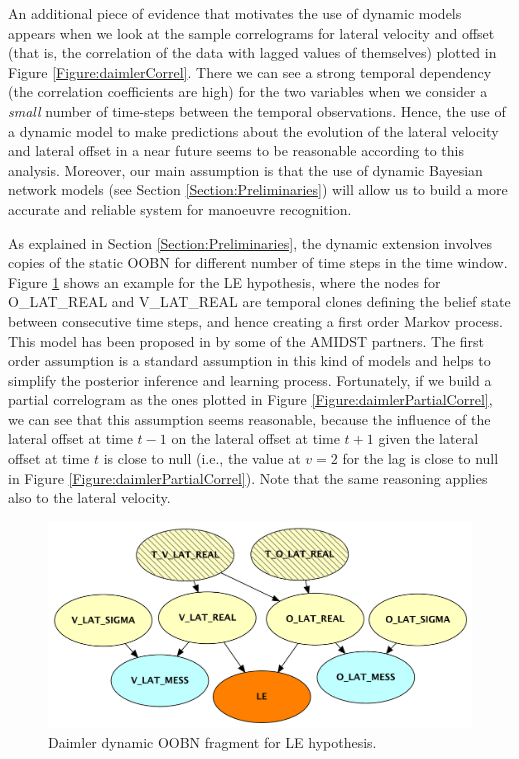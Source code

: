 An additional piece of evidence that motivates the use of dynamic models appears when we look at the sample correlograms for lateral velocity and offset (that is, the correlation of the data with lagged values of themselves) plotted in Figure \ref{Figure:daimlerCorrel}. There we can see a strong temporal dependency (the correlation coefficients are high) for the two variables when we consider a \textit{small} number of time-steps between the temporal observations. Hence, the use of a dynamic model to make predictions about the evolution of the lateral velocity and lateral offset in a near future seems to be reasonable according to this analysis. Moreover, our main assumption is that the use of dynamic Bayesian network models (see Section \ref{Section:Preliminaries}) will allow us to build a more accurate and reliable system for manoeuvre recognition. 

As explained in Section \ref{Section:Preliminaries}, the dynamic extension involves copies of the static OOBN for different number of time steps in the time window. Figure \ref{Figure:daimlerLEdyn} shows an example for the LE hypothesis, where the nodes for O\_LAT\_REAL and V\_LAT\_REAL are temporal clones defining the belief state between consecutive time steps, and hence creating a first order Markov process. This model has been proposed in \cite{Weidl2014} by some of the AMIDST partners. The first order assumption is a standard assumption in this kind of models and helps to simplify the posterior inference and learning process. Fortunately, if we build a partial correlogram as the ones plotted in Figure \ref{Figure:daimlerPartialCorrel}, we can see that this assumption seems reasonable, because the influence of the lateral offset at time $t-1$ on the lateral offset at time $t+1$ given the lateral offset at time $t$ is close to null (i.e., the value at $v=2$ for the lag is close to null in Figure \ref{Figure:daimlerPartialCorrel}). Note that the same reasoning applies also to the lateral velocity.

\begin{figure}[ht!]
\begin{center}
\includegraphics[scale=0.48]{./figures/DaimlerLEdyn}
\end{center}
\caption{\label{Figure:daimlerLEdyn}Daimler dynamic OOBN fragment for LE hypothesis.}
\end{figure}

